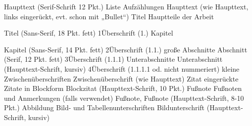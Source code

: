 \documentclass[]{book}
\theoremstyle{definition}
\theoremstyle{definition}
\theoremstyle{definition}
\theoremstyle{remark}
\begin{document}
Haupttext (Serif-Schrift 12 Pkt.) Liste Aufzählungen Haupttext (wie
Haupttext, links eingerückt, evt. schon mit „Bullet``) Titel Hauptteile
der Arbeit

Titel (Sans-Serif, 18 Pkt. fett) 1Überschrift (1.) Kapitel

Kapitel (Sans-Serif, 14 Pkt. fett) 2Überschrift (1.1.) große Abschnitte
Abschnitt (Serif, 12 Pkt. fett) 3Überschrift (1.1.1) Unterabschnitte
Unterabschnitt (Haupttext-Schrift, kursiv) 4Überschrift (1.1.1.1 od.
nicht nummeriert) kleine Zwischenüberschriften Zwischenüberschrift (wie
Haupttext) Zitat eingerückte Zitate in Blockform Blockzitat
(Haupttext-Schrift, 10 Pkt.) Fußnote Fußnoten und Anmerkungen (falls
verwendet) Fußnote, Fußnote (Haupttext-Schrift, 8-10 Pkt.) Abbildung
Bild- und Tabellenunterschriften Bildunterschrift (Haupttext-Schrift,
kursiv)
\end{document}

